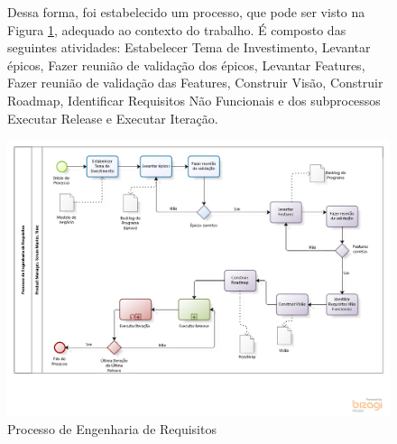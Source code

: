 \begin{figure}[!htb]

Dessa forma, foi estabelecido um processo, que pode ser visto na Figura \ref{fig:Processo}, adequado ao contexto do trabalho.
É composto das seguintes atividades: Estabelecer Tema de Investimento, Levantar épicos, Fazer reunião de validação dos épicos, 
Levantar Features, Fazer reunião de validação das Features, Construir Visão, Construir Roadmap, Identificar Requisitos Não Funcionais e dos 
subprocessos Executar Release e Executar Iteração.


\includegraphics[scale=0.5]{figuras/processo.png}
\caption{Processo de Engenharia de Requisitos}
\label{fig:Processo}
\end{figure}



